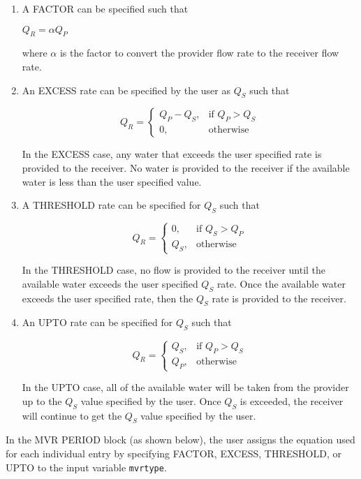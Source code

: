 \begin{enumerate}
\item A FACTOR can be specified such that 

$Q_R = \alpha Q_P$

\noindent where $\alpha$ is the factor to convert the provider flow rate to the receiver flow rate.

\item An EXCESS rate can be specified by the user as $Q_S$ such that

\[
    Q_R = 
\begin{cases}
    Q_P - Q_S, & \text{if } Q_P > Q_S \\
    0,              & \text{otherwise}
\end{cases}
\]

\noindent In the EXCESS case, any water that exceeds the user specified rate is provided to the receiver.  No water is provided to the receiver if the available water is less than the user specified value.

\item A THRESHOLD rate can be specified for $Q_S$ such that

\[
    Q_R = 
\begin{cases}
    0, & \text{if } Q_S > Q_P \\
    Q_S,              & \text{otherwise}
\end{cases}
\]

\noindent In the THRESHOLD case, no flow is provided to the receiver until the available water exceeds the user specified $Q_S$ rate.  Once the available water exceeds the user specified rate, then the $Q_S$ rate is provided to the receiver.

\item An UPTO rate can be specified for $Q_S$ such that

\[
    Q_R = 
\begin{cases}
    Q_S, & \text{if } Q_P > Q_S \\
    Q_P,              & \text{otherwise}
\end{cases}
\]

\noindent In the UPTO case, all of the available water will be taken from the provider up to the $Q_S$ value specified by the user.  Once $Q_S$ is exceeded, the receiver will continue to get the $Q_S$ value specified by the user.
\end{enumerate}

\noindent In the MVR PERIOD block (as shown below), the user assigns the equation used for each individual entry by specifying FACTOR, EXCESS, THRESHOLD, or UPTO to the input variable \texttt{mvrtype}.

